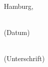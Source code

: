 \vspace{1cm}
Hamburg,\\[-1ex]

\mbox{}\hspace{2.2cm}\parbox[t]{4cm}{\centering \dotfill\\(Datum)}\hspace{0.5cm}
					\parbox[t]{8cm}{\centering \dotfill\\(Unterschrift)}
					
\cleardoublepage
\listoffigures
\listoftables
\lstlistoflistings



 


\cleardoublepage
\tableofcontents


%

\newpage


